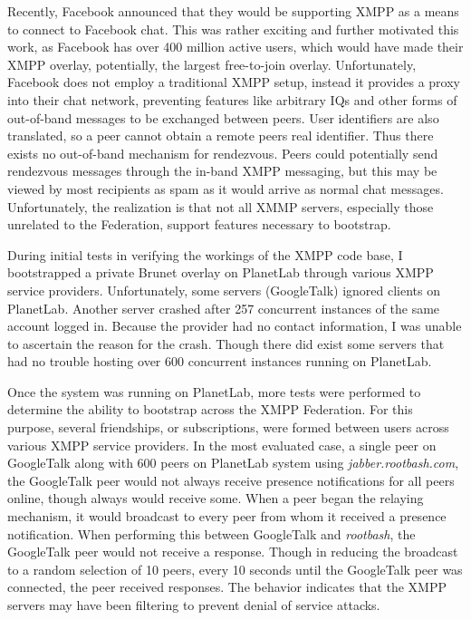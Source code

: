 Recently, Facebook announced that they would be supporting XMPP as a means to
connect to Facebook chat.  This was rather exciting and further motivated this
work, as Facebook has over 400 million active users, which would have made
their XMPP overlay, potentially, the largest free-to-join overlay.
Unfortunately, Facebook does not employ a traditional XMPP setup, instead it
provides a proxy into their chat network, preventing features like arbitrary
IQs and other forms of out-of-band messages to be exchanged between peers.
User identifiers are also translated, so a peer cannot obtain a remote peers
real identifier.  Thus there exists no out-of-band mechanism for rendezvous.
Peers could potentially send rendezvous messages through the in-band XMPP
messaging, but this may be viewed by most recipients as spam as it would arrive
as normal chat messages.  Unfortunately, the realization is that not all XMMP
servers, especially those unrelated to the Federation, support features
necessary to bootstrap.

During initial tests in verifying the workings of the XMPP code base, I
bootstrapped a private Brunet overlay on PlanetLab through various XMPP service
providers.  Unfortunately, some servers (GoogleTalk) ignored clients on
PlanetLab.  Another server crashed after 257 concurrent instances of the same
account logged in.  Because the provider had no contact information, I was
unable to ascertain the reason for the crash.  Though there did exist some
servers that had no trouble hosting over 600 concurrent instances running on
PlanetLab.

Once the system was running on PlanetLab, more tests were performed to
determine the ability to bootstrap across the XMPP Federation.  For this
purpose, several friendships, or subscriptions, were formed between users
across various XMPP service providers.  In the most evaluated case, a single
peer on GoogleTalk along with 600 peers on PlanetLab system using
\textit{jabber.rootbash.com}, the GoogleTalk peer would not always receive
presence notifications for all peers online, though always would receive some.
When a peer began the relaying mechanism, it would broadcast to every peer from
whom it received a presence notification.  When performing this between
GoogleTalk and \textit{rootbash}, the GoogleTalk peer would not receive a
response.  Though in reducing the broadcast to a random selection of 10 peers,
every 10 seconds until the GoogleTalk peer was connected, the peer received
responses.  The behavior indicates that the XMPP servers may have been
filtering to prevent denial of service attacks.

